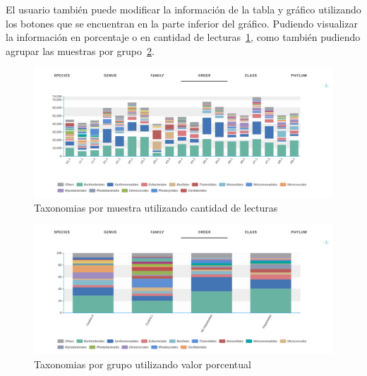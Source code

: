 El usuario también puede modificar la información de la tabla y gráfico utilizando los botones que se encuentran en la parte inferior del gráfico. 
Pudiendo visualizar la información en porcentaje o en cantidad de lecturas~\ref{fig:app-results-taxonomy-sample-nreads}, como también pudiendo agrupar las muestras por grupo~\ref{fig:app-results-taxonomy-groups-perc}.
\begin{figure}[H]
    \includegraphics[width=1\linewidth]{images/app/results/taxonomy_sample_nreads.png}

    \caption{Taxonomias por muestra utilizando cantidad de lecturas}
    \label{fig:app-results-taxonomy-sample-nreads}
\end{figure}

\begin{figure}[H]
    \includegraphics[width=1\linewidth]{images/app/results/taxonomy_grooups_perc.png}

    \caption{Taxonomias por grupo utilizando valor porcentual}
    \label{fig:app-results-taxonomy-groups-perc}
\end{figure}


